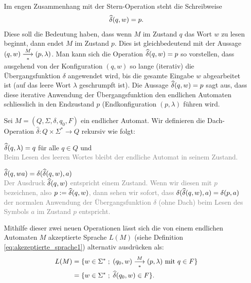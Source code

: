 Im engen Zusammenhang mit der Stern-Operation steht die Schreibweise
\begin{equation*}
	\widehat{\delta}(q,w) = p.
\end{equation*}
Diese soll die Bedeutung haben, dass wenn $M$ im Zustand $q$ das Wort $w$ zu lesen beginnt, dann endet $M$ im Zustand $p$. Dies ist gleichbedeutend mit der Aussage $(q,w)\underset{*}{\overset{M}{\longrightarrow}} (p,\lambda)$. Man kann sich die Operation $\widehat{\delta}(q,w) = p$ so vorstellen, dass ausgehend von der Konfiguration $(q,w)$ so lange (iterativ) die Übergangsfunktion $\delta$ angewendet wird, bis die gesamte Eingabe $w$ abgearbeitet ist (auf das leere Wort $\lambda$ geschrumpft ist). Die Aussage $\widehat{\delta}(q,w) = p$ sagt aus, dass diese iterative Anwendung der Übergangsfunktion den endlichen Automaten schliesslich in den Endzustand $p$ (Endkonfiguration $(p,\lambda)$ führen wird.
\begin{mydefinition}\label{mydefinition:dach_operation}
Sei $M = (Q,\Sigma, \delta, q_0, F)$ ein endlicher Automat. Wir definieren die Dach-Operation $\widehat{\delta}: Q\times \Sigma^* \to Q$ rekursiv wie folgt:
\begin{renum}
	\item $\widehat{\delta}(q,\lambda) = q$ für alle $q\in Q$ und\\
	\textcolor{Gray}{Beim Lesen des leeren Wortes bleibt der endliche Automat in seinem Zustand.}
	\item $\widehat{\delta}(q,wa) = \delta (\widehat{\delta}(q,w),a)$\\
	\textcolor{Gray}{Der Ausdruck $\widehat{\delta}(q,w)$ entspricht einem Zustand. Wenn wir diesen mit $p$ bezeichnen, also $p:= \widehat{\delta}(q,w)$, dann sehen wir sofort, dass $\delta(\widehat{\delta}(q,w),a) = \delta(p,a)$ der normalen Anwendung der Übergangsfunktion $\delta$ (ohne Dach) beim Lesen des Symbols $a$ im Zustand $p$ entspricht.}
\end{renum}
\end{mydefinition}
Mithilfe dieser zwei neuen Operationen lässt sich die von einem endlichen Automaten $M$ akzeptierte Sprache $L(M)$ (siehe Definition \cref{eq:akezeptierte_sprache1}) alternativ ausdrücken als:
\begin{equation*}
	\begin{split}
		L(M) & = \{ w\in\Sigma^* \; ; \; (q_0,w) \underset{*}{\overset{M}{\longrightarrow}} (p,\lambda) \text{ mit } q\in F\} \\
		     & = \{ w\in\Sigma^* \; ; \; \widehat{\delta}(q_0,w)\in F\}.
	\end{split}
\end{equation*}

